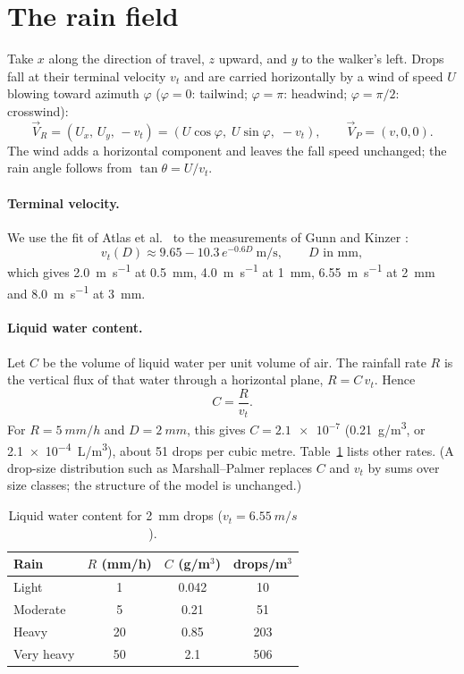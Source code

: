 \documentclass[11pt,a4paper]{article}
\newcommand{\VR}{\vec V_{\!R}}
\newcommand{\VP}{\vec V_{\!P}}
\begin{document}
\section{The rain field}\label{sec:rain}
Take $x$ along the direction of travel, $z$ upward, and $y$ to the walker's left. Drops fall at their terminal velocity $v_t$ and are carried horizontally by a wind of speed $U$ blowing toward azimuth $\varphi$ ($\varphi=0$: tailwind; $\varphi=\pi$: headwind; $\varphi=\pi/2$: crosswind):
\begin{equation}
\VR=(U_x,\,U_y,\,-v_t)=(U\cos\varphi,\;U\sin\varphi,\;-v_t),\qquad \VP=(v,0,0).
\end{equation}
The wind adds a horizontal component and leaves the fall speed unchanged; the rain angle follows from $\tan\theta=U/v_t$.

\paragraph{Terminal velocity.} We use the fit of Atlas et al.\ \cite{atlas1973} to the measurements of Gunn and Kinzer \cite{gunn1949}:
\begin{equation}
v_t(D)\approx 9.65-10.3\,e^{-0.6D}\ \si{\metre\per\second},\qquad D \text{ in mm},
\end{equation}
which gives \SI{2.0}{\metre\per\second} at \SI{0.5}{mm}, \SI{4.0}{\metre\per\second} at \SI{1}{mm}, \SI{6.55}{\metre\per\second} at \SI{2}{mm} and \SI{8.0}{\metre\per\second} at \SI{3}{mm}.

\paragraph{Liquid water content.} Let $C$ be the volume of liquid water per unit volume of air. The rainfall rate $R$ is the vertical flux of that water through a horizontal plane, $R=C\,v_t$. Hence
\begin{equation}
C=\frac{R}{v_t}.
\end{equation}
For $R=\SI{5}{mm/h}$ and $D=\SI{2}{mm}$, this gives $C=\num{2.1e-7}$ (\SI{0.21}{g/m^3}, or \SI{2.1e-4}{L/m^3}), about 51 drops per cubic metre. Table~\ref{tab:rain} lists other rates. (A drop-size distribution such as Marshall--Palmer \cite{marshall1948} replaces $C$ and $v_t$ by sums over size classes; the structure of the model is unchanged.)

\begin{table}[h]\centering
\caption{Liquid water content for \SI{2}{mm} drops ($v_t=\SI{6.55}{m/s}$).}\label{tab:rain}
\begin{tabular}{lccc}\toprule
Rain & $R$ (mm/h) & $C$ (g/m$^3$) & drops/m$^3$\\\midrule
Light & 1 & 0.042 & 10\\
Moderate & 5 & 0.21 & 51\\
Heavy & 20 & 0.85 & 203\\
Very heavy & 50 & 2.1 & 506\\\bottomrule
\end{tabular}
\end{table}
\end{document}
